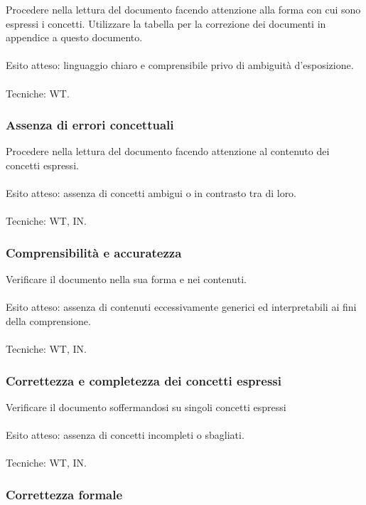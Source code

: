 Procedere nella lettura del documento facendo attenzione alla forma con cui
sono espressi i concetti. Utilizzare la tabella per la correzione dei documenti
in appendice a questo documento.
\\\\
Esito atteso: linguaggio chiaro e comprensibile privo di ambiguit\`a
d'esposizione.
\\\\
Tecniche: WT.

\subsubsection*{Assenza di errori concettuali}

Procedere nella lettura del documento facendo attenzione al contenuto dei
concetti espressi.\\\\
Esito atteso: assenza di concetti ambigui o in contrasto tra di loro.
\\\\
Tecniche: WT, IN.

\subsubsection*{Comprensibilit\`a e accuratezza}

Verificare il documento nella sua forma e nei contenuti.
\\\\
Esito atteso: assenza di contenuti eccessivamente generici ed interpretabili ai
fini della comprensione.
\\\\
Tecniche: WT, IN.

\subsubsection*{Correttezza e completezza dei concetti espressi}

Verificare il documento soffermandosi su singoli concetti espressi
\\\\
Esito atteso: assenza di concetti incompleti o sbagliati.
\\\\
Tecniche: WT, IN.

\subsubsection*{Correttezza formale}

